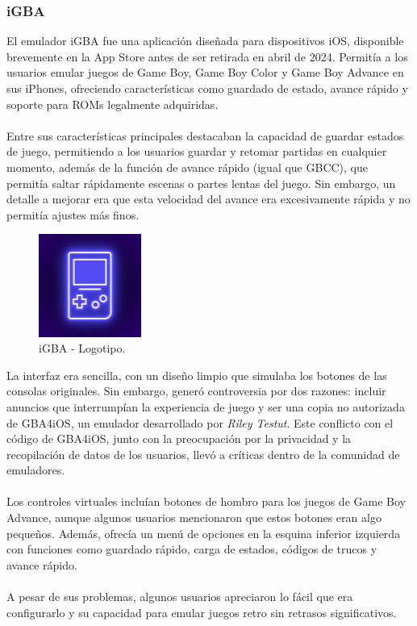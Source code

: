 \clearpage

\subsubsection{iGBA}

El emulador iGBA fue una aplicación diseñada para dispositivos iOS, disponible brevemente en la App Store antes de ser retirada en abril de 2024. Permitía a los usuarios emular juegos de Game Boy, Game Boy Color y Game Boy Advance en sus iPhones, ofreciendo características como guardado de estado, avance rápido y soporte para ROMs legalmente adquiridas.
\\\\
Entre sus características principales destacaban la capacidad de guardar estados de juego, permitiendo a los usuarios guardar y retomar partidas en cualquier momento, además de la función de avance rápido (igual que GBCC), que permitía saltar rápidamente escenas o partes lentas del juego. Sin embargo, un detalle a mejorar era que esta velocidad del avance era excesivamente rápida y no permitía ajustes más finos.

\begin{figure}[h]
    \centering
    \includegraphics[width=0.3\textwidth]{include/images/igbalogo.png}
    \caption{iGBA - Logotipo.}
    \label{figure:igbalogo}
\end{figure}

La interfaz era sencilla, con un diseño limpio que simulaba los botones de las consolas originales. Sin embargo, generó controversia por dos razones: incluir anuncios que interrumpían la experiencia de juego y ser una copia no autorizada de GBA4iOS, un emulador desarrollado por \textit{Riley Testut}. Este conflicto con el código de GBA4iOS, junto con la preocupación por la privacidad y la recopilación de datos de los usuarios, llevó a críticas dentro de la comunidad de emuladores​.
\\\\
Los controles virtuales incluían botones de hombro para los juegos de Game Boy Advance, aunque algunos usuarios mencionaron que estos botones eran algo pequeños. Además, ofrecía un menú de opciones en la esquina inferior izquierda con funciones como guardado rápido, carga de estados, códigos de trucos y avance rápido.
\\\\
A pesar de sus problemas, algunos usuarios apreciaron lo fácil que era configurarlo y su capacidad para emular juegos retro sin retrasos significativos.

